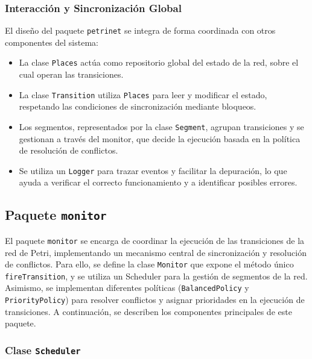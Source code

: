 \documentclass[12pt]{article}
\begin{document}
\subsubsection{Interacción y Sincronización Global}

El diseño del paquete \texttt{petrinet} se integra de forma coordinada con otros componentes del sistema:
\begin{itemize}
    \item La clase \texttt{Places} actúa como repositorio global del estado de la red, sobre el cual operan las transiciones.
    \item La clase \texttt{Transition} utiliza \texttt{Places} para leer y modificar el estado, respetando las condiciones de sincronización mediante bloqueos.
    \item Los segmentos, representados por la clase \texttt{Segment}, agrupan transiciones y se gestionan a través del monitor, que decide la ejecución basada en la política de resolución de conflictos.
    \item Se utiliza un \texttt{Logger} para trazar eventos y facilitar la depuración, lo que ayuda a verificar el correcto funcionamiento y a identificar posibles errores.
\end{itemize}

\subsection{Paquete \texttt{monitor}}

El paquete \texttt{monitor} se encarga de coordinar la ejecución de las transiciones de la red de Petri, implementando un mecanismo central de sincronización y resolución de conflictos. Para ello, se define la clase \texttt{Monitor} que expone el método único \texttt{fireTransition}, y se utiliza un Scheduler para la gestión de segmentos de la red. Asimismo, se implementan diferentes políticas (\texttt{BalancedPolicy} y \texttt{PriorityPolicy}) para resolver conflictos y asignar prioridades en la ejecución de transiciones. A continuación, se describen los componentes principales de este paquete.

\subsubsection{Clase \texttt{Scheduler}}
\end{document}
